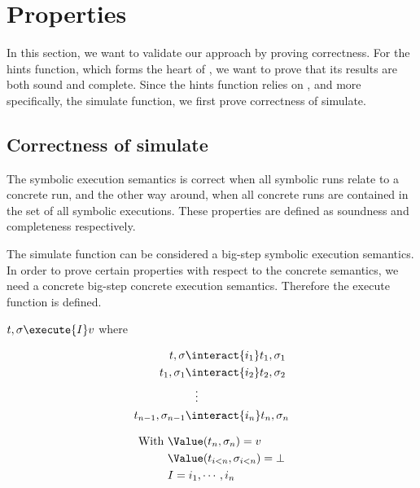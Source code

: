 
\section{Properties}
\label{sec:properties}

In this section, we want to validate our approach by proving correctness.
For the hints function, which forms the heart of \ASTOPHAT, we want to prove that its results are both sound and complete.
Since the hints function relies on \STOPHAT, and more specifically, the simulate function,
we first prove correctness of simulate.


\subsection{Correctness of simulate}

The symbolic execution semantics is correct when all symbolic runs relate to a concrete run,
and the other way around, when all concrete runs are contained in the set of all symbolic executions.
These properties are defined as soundness and completeness respectively.

The simulate function can be considered a big-step symbolic execution semantics.
In order to prove certain properties with respect to the concrete semantics,
we need a concrete big-step concrete execution semantics.
Therefore the execute function is defined.

\begin{definition}[Execute]
  $t,\sigma\execute{I} v$ where

  \begin{minipage}[c]{0.4\textwidth}
    \begin{align*}
      t,\sigma             & \interact{i_1}  t_1,\sigma_1\\
      t_1,\sigma_1         & \interact{i_2}  t_2,\sigma_2\\
                           & \hspace{3mm}\vdots    \\
      t_{n-1},\sigma_{n-1} & \interact{i_n}  t_n,\sigma_n
    \end{align*}
\end{minipage}
\begin{minipage}[c]{0.1\textwidth}
  \Quad
\end{minipage}
\begin{minipage}[c]{0.3\textwidth}
  \begin{align*}
  \text{With }&\Value(t_n,\sigma_n)=v\\
  &\Value(t_{i<n},\sigma_{i<n})=\bot\\
  &I=i_1,\cdots,i_n
\end{align*}
\end{minipage}
\label{def:evaluate}
\end{definition}

